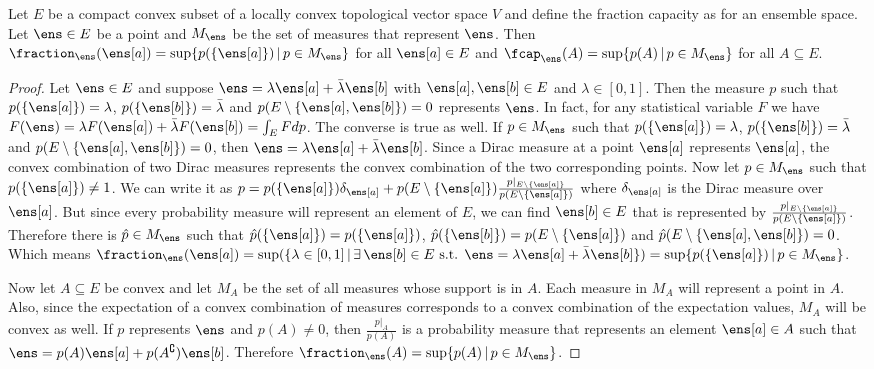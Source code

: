 \begin{mathSection}
\begin{prop}\label{pm-es-fractionSupChoquet}
	Let $E$ be a compact convex subset of a locally convex topological vector space $V$ and define the fraction capacity as for an ensemble space. Let $\ens \in E$ be a point and $M_{\ens}$ be the set of measures that represent $\ens$. Then $\fraction_{\ens}(\ens[a]) = \sup \{ p(\{\ens[a]\}) \, | \, p \in M_{\ens} \}$  for all $\ens[a] \in E$ and $\fcap_{\ens}(A) = \sup \{ p(A) \, | \, p \in M_{\ens} \}$ for all $A \subseteq E$.
\end{prop}

\begin{proof}
	Let $\ens \in E$ and suppose $\ens = \lambda \ens[a] + \bar{\lambda} \ens[b]$ with $\ens[a], \ens[b] \in E$ and $\lambda \in [0,1]$. Then the measure $p$ such that $p(\{\ens[a]\}) = \lambda$, $p(\{\ens[b]\}) = \bar{\lambda}$ and $p(E\setminus \{ \ens[a], \ens[b]\})=0$ represents $\ens$. In fact, for any statistical variable $F$ we have $F(\ens) = \lambda F(\ens[a]) + \bar{\lambda} F(\ens[b]) = \int_E F dp$. The converse is true as well. If $p \in M_{\ens}$ such that $p(\{\ens[a]\}) = \lambda$, $p(\{\ens[b]\}) = \bar{\lambda}$ and $p(E\setminus \{ \ens[a], \ens[b]\})=0$, then $\ens = \lambda \ens[a] + \bar{\lambda} \ens[b]$. Since a Dirac measure at a point $\ens[a]$ represents $\ens[a]$, the convex combination of two Dirac measures represents the convex combination of the two corresponding points. Now let $p \in M_{\ens}$ such that $p(\{\ens[a]\}) \neq 1$. We can write it as $p = p(\{\ens[a]\}) \delta_{\ens[a]} + p(E \setminus \{\ens[a]\})\frac{p|_{E \setminus \{\ens[a]\}}}{p(E \setminus \{\ens[a]\})}$ where $\delta_{\ens[a]}$ is the Dirac measure over $\ens[a]$. But since every probability measure will represent an element of $E$, we can find $\ens[b] \in E$ that is represented by $\frac{p|_{E \setminus \{\ens[a]\}}}{p(E \setminus \{\ens[a]\})}$. Therefore there is $\hat{p} \in M_{\ens}$ such that $\hat{p}(\{\ens[a]\}) = p(\{\ens[a]\})$, $\hat{p}(\{\ens[b]\}) = p(E \setminus \{\ens[a]\})$ and $\hat{p}(E\setminus \{ \ens[a], \ens[b]\})=0$. Which means $\fraction_{\ens}(\ens[a]) = \sup(\{ \lambda \in [0,1] \, | \, \exists \, \ens[b] \in E \text{ s.t. }  \ens = \lambda \ens[a] + \bar{\lambda} \ens[b] \}) = \sup \{ p(\{\ens[a]\}) \, | \, p \in M_{\ens} \}$.
	
	Now let $A \subseteq E$ be convex and let $M_A$ be the set of all measures whose support is in $A$. Each measure in $M_A$ will represent a point in $A$. Also, since the expectation of a convex combination of measures corresponds to a convex combination of the expectation values, $M_A$ will be convex as well. If $p$ represents $\ens$ and $p(A) \neq 0$, then $\frac{p|_A}{p(A)}$ is a probability measure that represents an element $\ens[a] \in A$ such that $\ens = p(A) \ens[a] + p(A^{\complement}) \ens[b]$. Therefore $\fraction_{\ens}(A) = \sup \{ p(A) \, | \, p \in M_{\ens} \}$.
\end{proof}
\end{mathSection}

